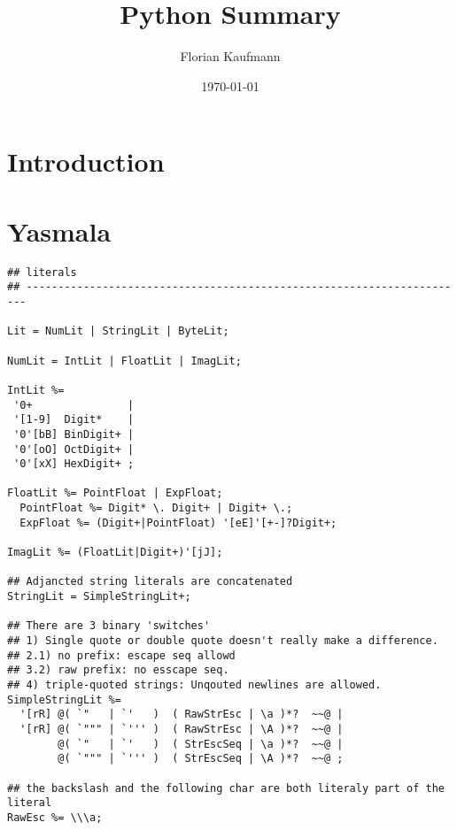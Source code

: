 \documentclass{article}
\begin{document}
\author{Florian Kaufmann}
\title{Python Summary}
\date{\today}
\maketitle
\tableofcontents

\section{Introduction}

\section{Yasmala}

\begin{verbatim}
## literals
## ----------------------------------------------------------------------
        
Lit = NumLit | StringLit | ByteLit;        
        
NumLit = IntLit | FloatLit | ImagLit;        
        
IntLit %=
 '0+               | 
 '[1-9]  Digit*    | 
 '0'[bB] BinDigit+ | 
 '0'[oO] OctDigit+ | 
 '0'[xX] HexDigit+ ;
 
FloatLit %= PointFloat | ExpFloat;
  PointFloat %= Digit* \. Digit+ | Digit+ \.;
  ExpFloat %= (Digit+|PointFloat) '[eE]'[+-]?Digit+;
        
ImagLit %= (FloatLit|Digit+)'[jJ];

## Adjancted string literals are concatenated
StringLit = SimpleStringLit+;
        
## There are 3 binary 'switches'
## 1) Single quote or double quote doesn't really make a difference.
## 2.1) no prefix: escape seq allowd
## 3.2) raw prefix: no esscape seq. 
## 4) triple-quoted strings: Unqouted newlines are allowed.
SimpleStringLit %=
  '[rR] @( `"   | `'   )  ( RawStrEsc | \a )*?  ~~@ |
  '[rR] @( `""" | `''' )  ( RawStrEsc | \A )*?  ~~@ |
        @( `"   | `'   )  ( StrEscSeq | \a )*?  ~~@ |
        @( `""" | `''' )  ( StrEscSeq | \A )*?  ~~@ ;
  
## the backslash and the following char are both literaly part of the literal
RawEsc %= \\\a;
       

\end{verbatim}
\end{document}
